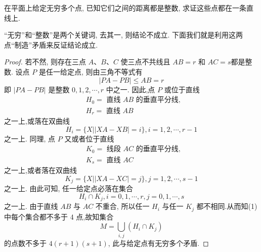 \begin{example}
	在平面上给定无穷多个点, 已知它们之间的距离都是整数, 求证这些点都在一条直线上.
\end{example}
\begin{analysis}
	“无穷”和“整数”是两个关键词, 去其一, 则结论不成立. 下面我们就是利用这两点“制造”矛盾来反证结论成立.
\end{analysis}
\begin{proof}
	若不然, 则存在三点 $A 、 B 、 C$ 使三点不共线且 $A B=r$ 和 $A C=s$都是整数. 设点 $P$ 是任一给定点, 则由三角不等式有
	$$
		|P A-P B| \leqslant A B=r
	$$
	即 $|P A-P B|$ 是整数 $0,1,2, \cdots, r$ 中之一. 因此,点 $P$ 或位于直线
	$$
		\begin{aligned}
			 & H_{0}=\text { 直线 } A B \text { 的垂直平分线, } \\
			 & H_{r}=\text { 直线 } A B
		\end{aligned}
	$$
	之一上,或落在双曲线
	$$
		H_{i}=\{X|| X A-X B \mid=i\}, i=1,2, \cdots, r-1
	$$
	之一上. 同理, 点 $P$ 又或者位于直线
	$$
		\begin{aligned}
			 & K_{0}=\text { 线段 } A C \text { 的垂直平分线, } \\
			 & K_{s}=\text { 直线 } A C
		\end{aligned}
	$$
	之一上,或者落在双曲线
	$$
		K_{j}=\{X|| X A-X C \mid=j\}, j=1,2, \cdots, s-1
	$$
	之一上. 由此可知, 任一给定点必落在集合
	\begin{equation*}
		H_{i} \cap K_{j}, i=0,1, \cdots, r, j=0,1, \cdots, s \tag{1}
	\end{equation*}
	之一上. 由于直线 $A B$ 与 $A C$ 不重合, 所以任一 $H_{i}$ 与任一 $K_{j}$ 都不相同.从而知(1)中每个集合都不多于 4 点,故知集合
	$$
		M=\bigcup_{i, j}\left(H_{i} \cap K_{j}\right)
	$$
	的点数不多于 $4(r+1)(s+1)$, 此与给定点有无穷多个矛盾.
\end{proof}

